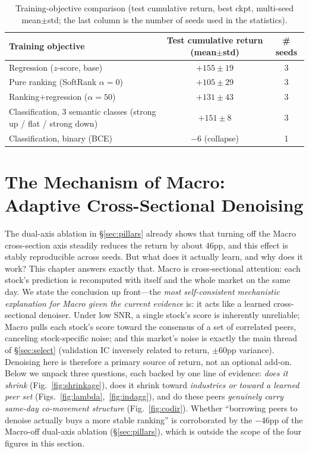 \documentclass[a4paper,11pt]{article}
\begin{document}
\begin{table}[H]
\centering
\caption{Training-objective comparison (test cumulative return, best ckpt,
multi-seed mean$\pm$std; the last column is the number of seeds used in the
statistics).}
\label{tab:objective}
\begin{tabular}{lcc}
\toprule
Training objective & Test cumulative return (mean$\pm$std) & \# seeds \\
\midrule
Regression ($z$-score, base) & $+155\pm19$ & 3 \\
Pure ranking (SoftRank $\alpha{=}0$) & $+105\pm29$ & 3 \\
Ranking$+$regression ($\alpha{=}50$) & $+131\pm43$ & 3 \\
Classification, 3 semantic classes (strong up / flat / strong down) & $+151\pm8$ & 3 \\
Classification, binary (BCE) & $-6$ (collapse) & 1 \\
\bottomrule
\end{tabular}
\end{table}

\section{The Mechanism of Macro: Adaptive Cross-Sectional Denoising}\label{sec:macro}
The dual-axis ablation in \S\ref{sec:pillars} already shows that turning off
the Macro cross-section axis steadily reduces the return by about $46$pp, and
this effect is stably reproducible across seeds. But what does it actually
learn, and why does it work? This chapter answers exactly that. Macro is
cross-sectional attention: each stock's prediction is recomputed with itself
and the whole market on the same day. We state the conclusion up front---the
\emph{most self-consistent mechanistic explanation for Macro given the current
evidence} is: it acts like a learned cross-sectional denoiser. Under low SNR,
a single stock's score is inherently unreliable; Macro pulls each stock's score
toward the consensus of a set of correlated peers, canceling stock-specific
noise; and this market's noise is exactly the main thread of \S\ref{sec:select}
(validation IC inversely related to return, $\pm60$pp variance). Denoising here
is therefore a primary source of return, not an optional add-on. Below we
unpack three questions, each backed by one line of evidence: \emph{does it
shrink} (Fig.~\ref{fig:shrinkage}), does it shrink toward \emph{industries or
toward a learned peer set} (Figs.~\ref{fig:lambda},~\ref{fig:indagg}), and do
these peers \emph{genuinely carry same-day co-movement structure}
(Fig.~\ref{fig:codir}). Whether ``borrowing peers to denoise actually buys a
more stable ranking'' is corroborated by the $-46$pp of the Macro-off
dual-axis ablation (\S\ref{sec:pillars}), which is outside the scope of the
four figures in this section.
\end{document}
